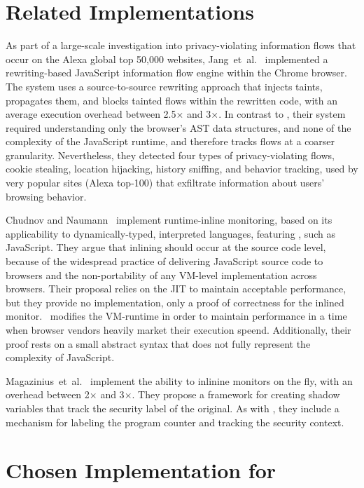 \section{Related Implementations}\label{sec:related-work}

As part of a large-scale investigation into privacy-violating information flows that occur on the Alexa global top 50,000 websites, Jang~et~al.~\cite{jang.etal+10} implemented a rewriting-based JavaScript information flow engine within the Chrome browser.
The system uses a source-to-source rewriting approach that injects taints, propagates them, and blocks tainted flows within the rewritten code, with an average execution overhead between 2.5$\times$ and 3$\times$.
In contrast to \FlowCore, their system required understanding only the browser's AST data structures, and none of the complexity of the JavaScript runtime, and therefore tracks flows at a coarser granularity.
Nevertheless, they detected four types of privacy-violating flows, cookie stealing, location hijacking, history sniffing, and behavior tracking, used by very popular sites (Alexa top-100) that exfiltrate information about users' browsing behavior.

Chudnov and Naumann~\cite{chudnov.naumann+10} implement runtime-inline monitoring, based on its applicability to dynamically-typed, interpreted languages, featuring , such as JavaScript.
They argue that inlining should occur at the source code level, because of the widespread practice of delivering JavaScript source code to browsers and the non-portability of any VM-level implementation across browsers.
Their proposal relies on the JIT to maintain acceptable performance, but they provide no implementation, only a proof of correctness for the inlined monitor.
\FlowCore\ modifies the VM-runtime in order to maintain performance in a time when browser vendors heavily market their execution speend.
Additionally, their proof rests on a small abstract syntax that does not fully represent the complexity of JavaScript.

Magazinius~et~al.~\cite{magazinius.etal+12} implement the ability to inlinine monitors on the fly, with an overhead between 2$\times$ and 3$\times$.
They propose a framework for creating shadow variables that track the security label of the original.
As with \FlowCore, they include a mechanism for labeling the program counter and tracking the security context.

\section{Chosen Implementation for \FlowCore}\label{sec:conclusion}
\label{sec:chosen-implementation}

